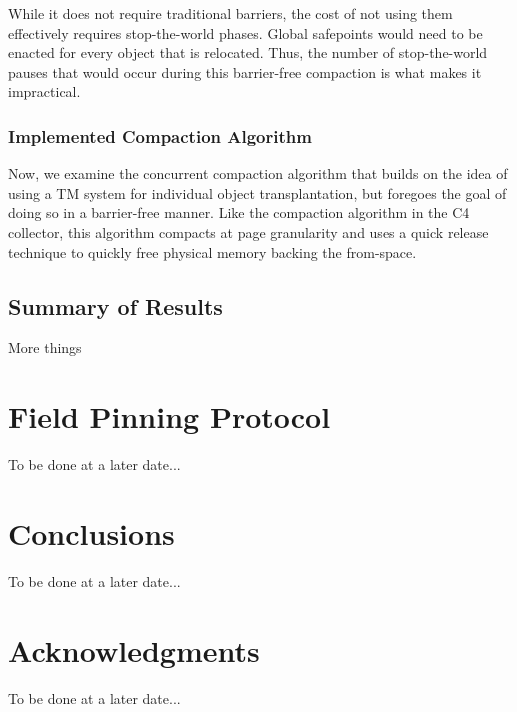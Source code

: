\documentclass{sig-alternate}
\begin{document}
While it does not require traditional barriers, the cost of not using them effectively
requires stop-the-world phases. Global safepoints would need to be enacted for every 
object that is relocated. Thus, the number of stop-the-world pauses that would occur
during this barrier-free compaction is what makes it impractical.



\subsubsection{Implemented Compaction Algorithm}
\label{sec:collieAlgorithmImplementation}

Now, we examine the concurrent compaction algorithm that builds on the idea of
using a TM system for individual object transplantation, but foregoes the goal 
of doing so in a barrier-free manner. Like the compaction algorithm in the C4 
collector, this algorithm compacts at page granularity and uses a quick release 
technique to quickly free physical memory backing the from-space.

\subsection{Summary of Results}
\label{sec:collieResults}

More things


\section{Field Pinning Protocol}
\label{sec:fpp}

To be done at a later date...


\section{Conclusions}
\label{sec:conclusions}

To be done at a later date...


\section*{Acknowledgments}
\label{sec:acknowledgments}

To be done at a later date...



  
\end{document}
